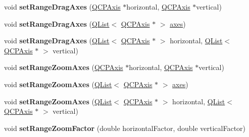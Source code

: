 \begin{DoxyCompactItemize}
\item 
void {\bfseries set\+Range\+Drag\+Axes} (\hyperlink{class_q_c_p_axis}{Q\+C\+P\+Axis} $\ast$horizontal, \hyperlink{class_q_c_p_axis}{Q\+C\+P\+Axis} $\ast$vertical)\hypertarget{class_q_c_p_axis_rect_a648cce336bd99daac4a5ca3e5743775d}{}\label{class_q_c_p_axis_rect_a648cce336bd99daac4a5ca3e5743775d}

\item 
void {\bfseries set\+Range\+Drag\+Axes} (\hyperlink{class_q_list}{Q\+List}$<$ \hyperlink{class_q_c_p_axis}{Q\+C\+P\+Axis} $\ast$ $>$ \hyperlink{class_q_c_p_axis_rect_a66654d51ca611ef036ded36250cd2518}{axes})\hypertarget{class_q_c_p_axis_rect_af0fbc510147a2a54b9c8cd296e6df8ac}{}\label{class_q_c_p_axis_rect_af0fbc510147a2a54b9c8cd296e6df8ac}

\item 
void {\bfseries set\+Range\+Drag\+Axes} (\hyperlink{class_q_list}{Q\+List}$<$ \hyperlink{class_q_c_p_axis}{Q\+C\+P\+Axis} $\ast$ $>$ horizontal, \hyperlink{class_q_list}{Q\+List}$<$ \hyperlink{class_q_c_p_axis}{Q\+C\+P\+Axis} $\ast$ $>$ vertical)\hypertarget{class_q_c_p_axis_rect_a8366903edcb3bb703a8b0be783a85746}{}\label{class_q_c_p_axis_rect_a8366903edcb3bb703a8b0be783a85746}

\item 
void {\bfseries set\+Range\+Zoom\+Axes} (\hyperlink{class_q_c_p_axis}{Q\+C\+P\+Axis} $\ast$horizontal, \hyperlink{class_q_c_p_axis}{Q\+C\+P\+Axis} $\ast$vertical)\hypertarget{class_q_c_p_axis_rect_a9442cca2aa358405f39a64d51eca13d2}{}\label{class_q_c_p_axis_rect_a9442cca2aa358405f39a64d51eca13d2}

\item 
void {\bfseries set\+Range\+Zoom\+Axes} (\hyperlink{class_q_list}{Q\+List}$<$ \hyperlink{class_q_c_p_axis}{Q\+C\+P\+Axis} $\ast$ $>$ \hyperlink{class_q_c_p_axis_rect_a66654d51ca611ef036ded36250cd2518}{axes})\hypertarget{class_q_c_p_axis_rect_a89c1ab7ee6d2a14b56c57c9a796ba623}{}\label{class_q_c_p_axis_rect_a89c1ab7ee6d2a14b56c57c9a796ba623}

\item 
void {\bfseries set\+Range\+Zoom\+Axes} (\hyperlink{class_q_list}{Q\+List}$<$ \hyperlink{class_q_c_p_axis}{Q\+C\+P\+Axis} $\ast$ $>$ horizontal, \hyperlink{class_q_list}{Q\+List}$<$ \hyperlink{class_q_c_p_axis}{Q\+C\+P\+Axis} $\ast$ $>$ vertical)\hypertarget{class_q_c_p_axis_rect_ae29d6e9e54ebd981769c986e498ae118}{}\label{class_q_c_p_axis_rect_ae29d6e9e54ebd981769c986e498ae118}

\item 
void {\bfseries set\+Range\+Zoom\+Factor} (double horizontal\+Factor, double vertical\+Factor)\hypertarget{class_q_c_p_axis_rect_a895d7ac745ea614e04056244b3c138ac}{}\label{class_q_c_p_axis_rect_a895d7ac745ea614e04056244b3c138ac}


\end{DoxyCompactItemize}

